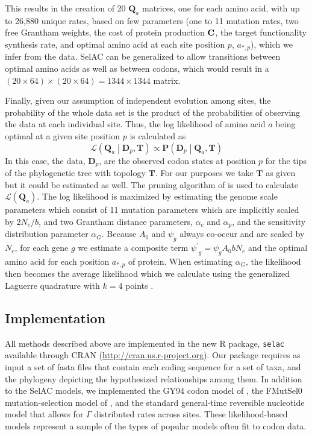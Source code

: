 \documentclass{article}
\newcommand{\Cost}{\ensuremath{\text{\textbf{C}}}\xspace}
\newcommand{\Ne}{\ensuremath{{N_e}}\xspace} %
\newcommand{\Lik}{\ensuremath{\mathcal{L}}\xspace}%
\newcommand{\Pmatrix}{\ensuremath{\mathbf{P}}\xspace}
\newcommand{\Tmatrix}{\ensuremath{\mathbf{T}}\xspace}
\newcommand{\Dmatrixp}{\ensuremath{\mathbf{D}_p}\xspace}
\newcommand{\Qmatrix}{\ensuremath{\mathbf{Q}}\xspace}
\newcommand{\Qmatrixa}{\ensuremath{\Qmatrix_a}\xspace}
\newcommand{\selac}{SelAC\xspace}
\newcommand{\alphac}{\ensuremath{\alpha_c}\xspace}
\newcommand{\alphag}{\ensuremath{\alpha_G}\xspace}
\newcommand{\alphap}{\ensuremath{\alpha_p}\xspace}
\newcommand{\aoptp}{\ensuremath{a_{*,p}}\xspace}
\newcommand{\psiprime}{\ensuremath{\psi^\prime}\xspace}
\begin{document}
This results in the creation of 20 \Qmatrixa matrices, one for each amino acid, with up to 26,880 unique rates, based on few parameters (one to 11 mutation rates, two free Grantham weights, the cost of protein production \Cost, the target functionality synthesis rate, and optimal amino acid at each site position $p$, \aoptp), which we infer from the data.
\selac can be generalized to allow transitions between optimal amino acids as well as between codons, which would result in a $(20 \times 64) \times (20 \times 64) =  1344 \times 1344$ matrix.

Finally, given our assumption of independent evolution among sites, the probability of the whole data set is the product of the probabilities of observing the data at each individual site.
Thus, the log likelihood of amino acid $a$ being optimal at a given site position $p$ is calculated as
\begin{equation}
\Lik\left(\Qmatrixa\middle| \Dmatrixp, \Tmatrix\right) \propto \Pmatrix\left(\Dmatrixp\middle|\Qmatrixa,\Tmatrix\right)
\end{equation}
In this case, the data, $\Dmatrixp$, are the observed codon states at position $p$ for the tips of the phylogenetic tree with topology $\Tmatrix$.
For our purposes we take \Tmatrix as given but it could be estimated as well.
The pruning algorithm of \citet{Felsenstein1981} is used to calculate $\Lik(\Qmatrixa)$.
The log likelihood is maximized by estimating the genome scale parameters which consist of  11 mutation parameters which are implicitly scaled by $2 \Ne/b$, and two Grantham distance parameters, $\alphac$ and $\alphap$, and the sensitivity distribution parameter \alphag.
Because $A_0$ and $\psi_g$ always co-occur and are scaled by \Ne, for each gene $g$ we estimate a composite term $\psiprime_g = \psi_g A_0 b \Ne$  and the optimal amino acid for each position \aoptp of protein.
When estimating \alphag, the likelihood then becomes the average likelihood which we calculate using the generalized Laguerre quadrature with $k = 4$ points \citep{Felsenstein2001}.

\subsection*{Implementation}
All methods described above are implemented in the new R package, \texttt{selac} available through CRAN (\url{http://cran.us.r-project.org}).
Our package requires as input a set of fasta files that contain each coding sequence for a set of taxa, and the phylogeny depicting the hypothesized relationships among them.
In addition to the SelAC models, we implemented the GY94 codon model of \citet{GoldmanAndYang1994}, the FMutSel0 mutation-selection model of \citet{YangAndNielsen2008}, and the standard general-time reversible nucleotide model that allows for $\Gamma$ distributed rates across sites.
These likelihood-based models represent a sample of the types of popular models often fit to codon data.
\end{document}
